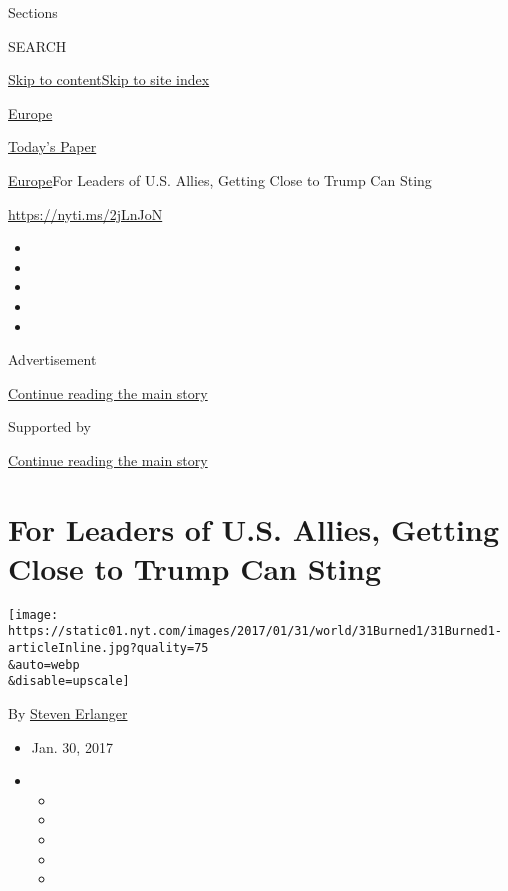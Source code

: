 Sections

SEARCH

\protect\hyperlink{site-content}{Skip to
content}\protect\hyperlink{site-index}{Skip to site index}

\href{https://www.nytimes.com/section/world/europe}{Europe}

\href{https://myaccount.nytimes.com/auth/login?response_type=cookie\&client_id=vi}{}

\href{https://www.nytimes.com/section/todayspaper}{Today's Paper}

\href{/section/world/europe}{Europe}\textbar{}For Leaders of U.S.
Allies, Getting Close to Trump Can Sting

\url{https://nyti.ms/2jLnJoN}

\begin{itemize}
\item
\item
\item
\item
\item
\end{itemize}

Advertisement

\protect\hyperlink{after-top}{Continue reading the main story}

Supported by

\protect\hyperlink{after-sponsor}{Continue reading the main story}

\hypertarget{for-leaders-of-us-allies-getting-close-to-trump-can-sting}{%
\section{For Leaders of U.S. Allies, Getting Close to Trump Can
Sting}\label{for-leaders-of-us-allies-getting-close-to-trump-can-sting}}

\texttt{[image: https://static01.nyt.com/images/2017/01/31/world/31Burned1/31Burned1-articleInline.jpg?quality=75\\\&auto=webp\\\&disable=upscale]}

By \href{http://www.nytimes.com/by/steven-erlanger}{Steven Erlanger}

\begin{itemize}
\item
  Jan. 30, 2017
\item
  \begin{itemize}
  \item
  \item
  \item
  \item
  \item
  \end{itemize}
\end{itemize}


